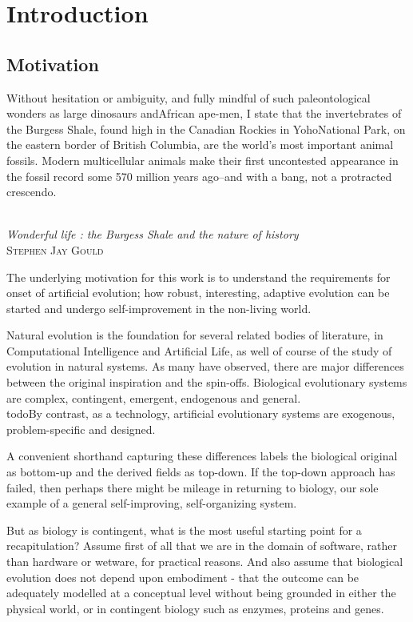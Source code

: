 \chapter{Introduction}\label{introduction}

\section{Motivation}\label{motivation}

\settowidth{\epigraphwidth}{Wonderful life : the Burgess Shale and the nature of history}
\epigraph{%
Without hesitation or ambiguity, and fully mindful of such paleontological wonders as large dinosaurs andAfrican ape-men, I state that the invertebrates of the Burgess Shale, found high in the Canadian Rockies in YohoNational Park, on the eastern border of British Columbia, are the world's most important animal fossils. Modern multicellular animals make their first uncontested appearance in the fossil record some 570 million years ago--and with a bang, not a protracted crescendo.}%
{\textit{\\Wonderful life : the Burgess Shale and the nature of history}\\\textsc{Stephen Jay Gould}}

The underlying motivation for this work is to understand the requirements for onset of artificial evolution; how robust, interesting, adaptive evolution can be started and undergo self-improvement in the non-living world.

Natural evolution is the foundation for several related bodies of literature, in Computational Intelligence and Artificial Life, as well of course of the study of evolution in natural systems. As many have observed, there are major differences between the original inspiration and the spin-offs. Biological evolutionary systems are complex, contingent, emergent, endogenous and general. \\todo{By contrast, as a technology, artificial evolutionary systems are exogenous, problem-specific and designed.}

A convenient shorthand capturing these differences labels the biological original as bottom-up and the derived fields as top-down. If the top-down approach has failed, then perhaps there might be mileage in returning to biology, our sole example of a general self-improving, self-organizing system.

But as biology is contingent, what is the most useful starting point for a recapitulation? Assume first of all that we are in the domain of software, rather than hardware or wetware, for practical reasons. And also assume that biological evolution does not depend upon embodiment - that the outcome can be adequately modelled at a conceptual level without being grounded in either the physical world, or in contingent biology such as enzymes, proteins and genes.

